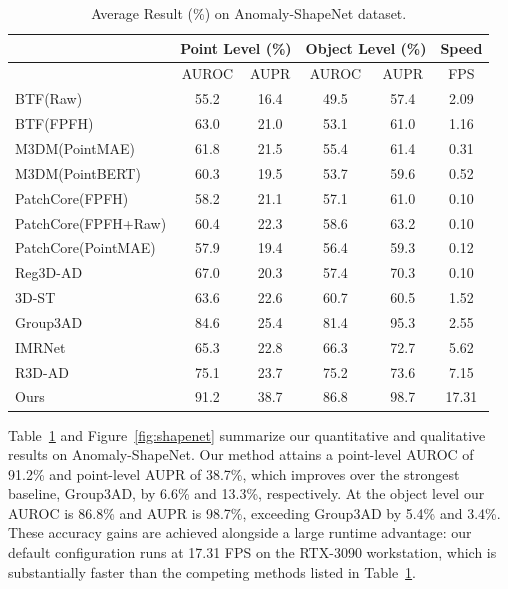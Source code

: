 \begin{table}[ht]
\centering
\caption{Average Result (\%) on Anomaly-ShapeNet dataset.}
\label{tab:ShapeNet}
\begin{tabular}{l|cc|cc|c}
\hline
& \multicolumn{2}{c|}{Point Level (\%)} & \multicolumn{2}{c|}{Object Level (\%)} & Speed \\
\hline
& AUROC & AUPR & AUROC & AUPR & FPS \\ 
\hline
BTF(Raw)                            & 55.2 & 16.4  & 49.5 & 57.4  & 2.09 \\ 
BTF(FPFH)                           & 63.0 & 21.0  & 53.1 & 61.0  & 1.16 \\ 
M3DM(PointMAE)                      & 61.8 & 21.5  & 55.4 & 61.4  & 0.31 \\ 
M3DM(PointBERT)                     & 60.3 & 19.5  & 53.7 & 59.6  & 0.52 \\ 
PatchCore(FPFH)                     & 58.2 & 21.1  & 57.1 & 61.0  & 0.10 \\ 
PatchCore(FPFH+Raw)                 & 60.4 & 22.3  & 58.6 & 63.2  & 0.10 \\ 
PatchCore(PointMAE)                 & 57.9 & 19.4  & 56.4 & 59.3  & 0.12 \\ 
Reg3D-AD \cite{liu2023real3d}       & 67.0 & 20.3  & 57.4 & 70.3  & 0.10 \\ 
3D-ST \cite{bergmann2023anomaly}    & 63.6 & 22.6  & 60.7 & 60.5  & 1.52 \\
Group3AD \cite{zhu2024towards}      & 84.6 & 25.4  & 81.4 & 95.3  & 2.55 \\ 
IMRNet \cite{li2024towards}         & 65.3 & 22.8  & 66.3 & 72.7  & 5.62 \\
R3D-AD \cite{zhou2024r3d}           & 75.1 & 23.7  & 75.2 & 73.6  & 7.15 \\
Ours                                & 91.2 & 38.7  & 86.8 & 98.7  & 17.31 \\
\hline
\end{tabular}
\end{table}

Table~\ref{tab:ShapeNet} and Figure~\ref{fig:shapenet} summarize our quantitative and qualitative results on Anomaly-ShapeNet. Our method attains a point-level AUROC of 91.2\% and point-level AUPR of 38.7\%, which improves over the strongest baseline, Group3AD, by 6.6\% and 13.3\%, respectively. At the object level our AUROC is 86.8\% and AUPR is 98.7\%, exceeding Group3AD by 5.4\% and 3.4\%. These accuracy gains are achieved alongside a large runtime advantage: our default configuration runs at 17.31 FPS on the RTX-3090 workstation, which is substantially faster than the competing methods listed in Table~\ref{tab:ShapeNet}.

